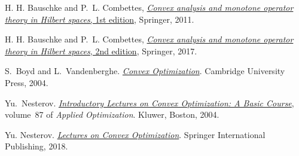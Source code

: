 \documentclass{article}
\newcommand{\<}{\langle}
\renewcommand{\>}{\rangle}
\begin{document}
\begin{thebibliography}{AZQRY16}

H. H. Bauschke and P.~L. Combettes, \href{https://link.springer.com/book/10.1007/978-1-4419-9467-7}{\emph{Convex analysis and monotone
  operator theory in {H}ilbert spaces}, 1st edition}, {S}pringer, 2011.
  
H. H. Bauschke and P.~L. Combettes, \href{https://link.springer.com/book/10.1007/978-3-319-48311-5}{\emph{Convex analysis and monotone
  operator theory in {H}ilbert spaces}, 2nd edition}, {S}pringer, 2017.

S.~Boyd and L.~Vandenberghe.
\newblock \href{http://www.stanford.edu/~boyd/cvxbook/}{{\em Convex Optimization}}.
\newblock Cambridge University Press, 2004.

Yu.~Nesterov.
\newblock \href{https://link.springer.com/book/10.1007/978-1-4419-8853-9}{{\em Introductory Lectures on Convex Optimization: A Basic Course}},
  volume~87 of {\em Applied Optimization}.
\newblock Kluwer, Boston, 2004.

Yu. Nesterov.
\newblock \href{https://link.springer.com/book/10.1007/978-3-319-91578-4}{{\em Lectures on Convex Optimization}}.
\newblock Springer International Publishing, 2018.

\end{thebibliography}
\end{document}

